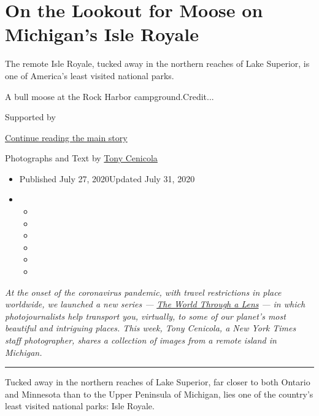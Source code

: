 \hypertarget{on-the-lookout-for-moose-on-michigans-isle-royale}{%
\section{On the Lookout for Moose on Michigan's Isle
Royale}\label{on-the-lookout-for-moose-on-michigans-isle-royale}}

The remote Isle Royale, tucked away in the northern reaches of Lake
Superior, is one of America's least visited national parks.

A bull moose at the Rock Harbor campground.Credit...

Supported by

\protect\hyperlink{after-sponsor}{Continue reading the main story}

Photographs and Text by
\href{https://www.nytimes3xbfgragh.onion/by/tony-cenicola}{Tony
Cenicola}

\begin{itemize}
\item
  Published July 27, 2020Updated July 31, 2020
\item
  \begin{itemize}
  \item
  \item
  \item
  \item
  \item
  \item
  \end{itemize}
\end{itemize}

\emph{At the onset of the coronavirus pandemic, with travel restrictions
in place worldwide, we launched a new series ---}
\href{https://www.nytimes3xbfgragh.onion/column/the-world-through-a-lens}{\emph{The
World Through a Lens}} \emph{--- in which photojournalists help
transport you, virtually, to some of our planet's most beautiful and
intriguing places. This week, Tony Cenicola, a New York Times staff
photographer, shares a collection of images from a remote island in
Michigan.}

\begin{center}\rule{0.5\linewidth}{\linethickness}\end{center}

Tucked away in the northern reaches of Lake Superior, far closer to both
Ontario and Minnesota than to the Upper Peninsula of Michigan, lies one
of the country's least visited national parks: Isle Royale.

